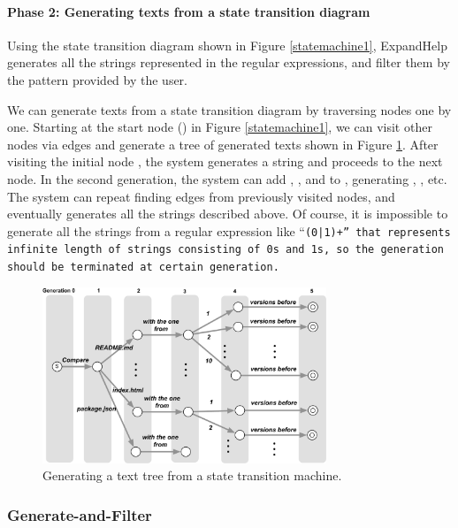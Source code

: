 \documentclass{sigchi}
\def\EH{\textsf{ExpandHelp}}
\begin{document}
\paragraph{Phase 2: Generating texts from a state transition diagram}

Using the state transition diagram shown in Figure \ref{statemachine1},
{\EH} generates all the strings represented in the regular expressions,
and filter them by the pattern provided by the user.

We can generate texts from a state transition diagram by traversing nodes one by one.
Starting at the start node
()
in Figure \ref{statemachine1},
we can visit other nodes via edges and generate a tree of generated texts
shown in Figure \ref{gentree1}.
After visiting the initial node
,
the system generates a string  and proceeds to the next node.
In the second generation,
the system can add , , and 
to , generating
, , etc.
The system can repeat finding edges from previously visited nodes,
and eventually generates all the strings described above.
Of course, it is impossible to generate all the strings
from a regular expression like ``\tt{(0|1)+}'' that represents infinite length of
strings consisting of \tt{0}s and \tt{1}s, so the generation should be
terminated at certain generation.

\begin{figure}[htb]
\includegraphics[width=85mm,bb=0 0 643 398]{figures/gentree1.pdf}
\caption{Generating a text tree from a state transition machine.}
\label{gentree1}
\end{figure}

\subsubsection{Generate-and-Filter}
\end{document}
